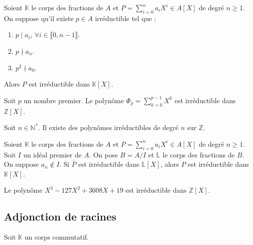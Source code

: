 
  \begin{theorem}
    Soient $\mathbb{K}$ le corps des fractions de $A$ et $P = \sum_{i=0}^n a_i X^i \in A[X]$ de degré $n \geq 1$. On suppose qu'il existe $p \in A$ irréductible tel que :
    \begin{enumerate}[label={\bfseries(\roman*)}]
      \item $p \mid a_i$, $\forall i \in \llbracket 0, n-1 \rrbracket$.
      \item $p \nmid a_n$.
      \item $p^2 \nmid a_0$.
    \end{enumerate}
    Alors $P$ est irréductible dans $\mathbb{K}[X]$.
  \end{theorem}

  \begin{example}
    Soit $p$ un nombre premier. Le polynôme $\Phi_p = \sum_{k=0}^{p-1} X^k$ est irréductible dans $\mathbb{Z}[X]$.
  \end{example}


  \begin{application}
    \label{141-3}
    Soit $n \in \mathbb{N}^*$. Il existe des polynômes irréductibles de degré $n$ sur $\mathbb{Z}$.
  \end{application}


  \begin{theorem}
    Soient $\mathbb{K}$ le corps des fractions de $A$ et $P = \sum_{i=0}^n a_i X^i \in A[X]$ de degré $n \geq 1$. Soit $I$ un idéal premier de $A$. On pose $B=A/I$ et $\mathbb{L}$ le corps des fractions de $B$. On suppose $a_n \notin I$.
    \newpar
    Si $\overline{P}$ est irréductible dans $\mathbb{L}[X]$, alors $P$ est irréductible dans $\mathbb{K}[X]$.
  \end{theorem}

  \begin{example}
    Le polynôme $X^3-127X^2+3608X+19$ est irréductible dans $\mathbb{Z}[X]$.
  \end{example}

  \subsection{Adjonction de racines}

  Soit $\mathbb{K}$ un corps commutatif.

